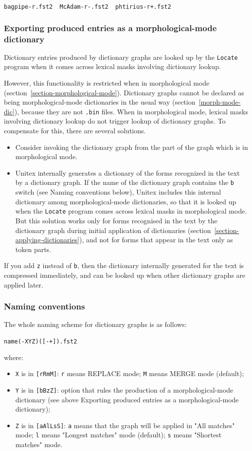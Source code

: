 \bigskip
\verb?bagpipe-r.fst2  McAdam-r-.fst2  phtirius-r+.fst2?

\subsubsection{Exporting produced entries as a morphological-mode dictionary}
Dictionary entries produced by dictionary graphs are looked up 
by the \verb+Locate+ program when it comes across lexical masks involving dictionary lookup.

\bigskip
\noindent However, this functionality is restricted when in morphological mode (section~\ref{section-morphological-mode}).
Dictionary graphs cannot be declared as being morphological-mode 
dictionaries in the usual way (section~\ref{morph-mode-dic}), because they are not \verb+.bin+ files.
When in morphological mode, lexical masks involving dictionary lookup do not trigger lookup of dictionary graphs.
To compensate for this, there are several solutions.
\begin{itemize}
\item Consider invoking the dictionary graph from the part of the graph which is in morphological mode.
\item Unitex internally generates a dictionary of the forms recognized in the text by a dictionary graph.
If the name of the dictionary graph contains the \verb+b+ switch (see Naming conventions below),
Unitex includes this internal dictionary among morphological-mode dictionaries, so that it is looked up
when the \verb+Locate+ program comes across lexical masks in morphological mode. But this
solution works only for forms recognised in the text by the dictionary graph during initial application
 of dictionaries (section~\ref{section-applying-dictionaries}), and not for forms that appear in the text only as token parts.
\end{itemize}
If you add \verb+z+ instead of \verb+b+, then the dictionary internally generated for the text
is compressed immediately, and  can be looked up when other dictionary graphs are applied later.
 
\subsubsection{Naming conventions}
The whole naming scheme for dictionary graphs is as follows:

\verb$name(-XYZ)([-+]).fst2$

\noindent where:
\begin{itemize}
\item \verb+X+ is in \verb+[rRmM]+: \verb+r+ means REPLACE mode; \verb+M+ means MERGE mode (default);
\item \verb+Y+ is in \verb+[bBzZ]+: option that rules the production of a morphological-mode dictionary (see above Exporting produced entries as a morphological-mode dictionary);
\item \verb+Z+ is in \verb+[aAlLsS]+: \verb+a+ means that the graph will be applied in "All matches" mode; \verb+l+ means 
      "Longest matches" mode (default); \verb+s+ means "Shortest matches" mode.
\end{itemize}



